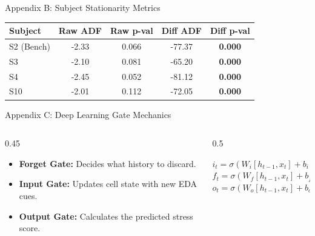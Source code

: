\documentclass[aspectratio=169, 10pt]{beamer}
\begin{document}
\begin{frame}{Appendix B: Subject Stationarity Metrics}
    \begin{table}[H]
        \centering \small
        \begin{tabular}{lcccc}
            \toprule \textbf{Subject} & \textbf{Raw ADF} & \textbf{Raw p-val} & \textbf{Diff ADF} & \textbf{Diff p-val} \\ \midrule
            S2 (Bench) & -2.33 & 0.066 & -77.37 & \textbf{0.000} \\
            S3 & -2.10 & 0.081 & -65.20 & \textbf{0.000} \\
            S4 & -2.45 & 0.052 & -81.12 & \textbf{0.000} \\
            S10 & -2.01 & 0.112 & -72.05 & \textbf{0.000} \\
            \bottomrule
        \end{tabular}
    \end{table}
\end{frame}

\begin{frame}{Appendix C: Deep Learning Gate Mechanics}
    \begin{columns}
        \begin{column}{0.45\textwidth}
            \begin{itemize}
                \item \textbf{Forget Gate:} Decides what history to discard.
                \item \textbf{Input Gate:} Updates cell state with new EDA cues.
                \item \textbf{Output Gate:} Calculates the predicted stress score.
            \end{itemize}
        \end{column}
        \begin{column}{0.5\textwidth}
            \begin{tcolorbox}[colback=Midnight!5, colframe=Midnight, title=Mathematical Update]
                $i_t = \sigma(W_i [h_{t-1}, x_t] + b_i)$\\
                $f_t = \sigma(W_f [h_{t-1}, x_t] + b_f)$\\
                $o_t = \sigma(W_o [h_{t-1}, x_t] + b_o)$
            \end{tcolorbox}
        \end{column}
    \end{columns}
\end{frame}

\begin{frame}[plain]
\end{frame}
\end{document}
